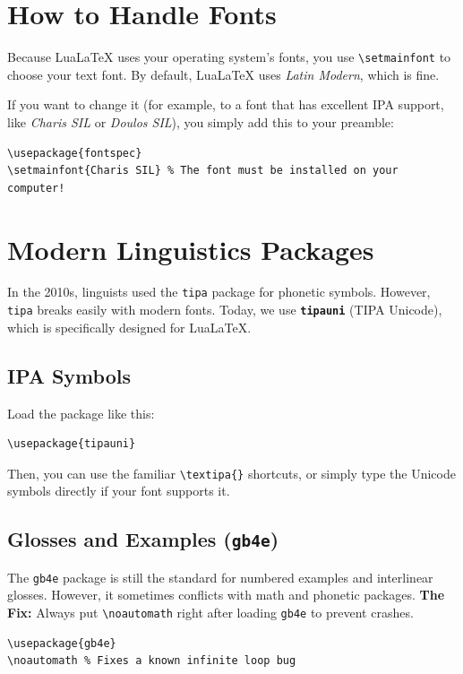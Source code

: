 \documentclass[11pt,a4paper]{article}
\begin{document}
\section{How to Handle Fonts}

Because LuaLaTeX uses your operating system's fonts, you use \texttt{\textbackslash setmainfont} to choose your text font. By default, LuaLaTeX uses \textit{Latin Modern}, which is fine.

If you want to change it (for example, to a font that has excellent IPA support, like \textit{Charis SIL} or \textit{Doulos SIL}), you simply add this to your preamble:
\begin{lstlisting}
\usepackage{fontspec}
\setmainfont{Charis SIL} % The font must be installed on your computer!
\end{lstlisting}

\section{Modern Linguistics Packages}

In the 2010s, linguists used the \texttt{tipa} package for phonetic symbols. However, \texttt{tipa} breaks easily with modern fonts. Today, we use \textbf{\texttt{tipauni}} (TIPA Unicode), which is specifically designed for LuaLaTeX.

\subsection{IPA Symbols}
Load the package like this:
\begin{lstlisting}
\usepackage{tipauni}
\end{lstlisting}
Then, you can use the familiar \texttt{\textbackslash textipa\{\}} shortcuts, or simply type the Unicode symbols directly if your font supports it.

\subsection{Glosses and Examples (\texttt{gb4e})}
The \texttt{gb4e} package is still the standard for numbered examples and interlinear glosses. However, it sometimes conflicts with math and phonetic packages.
\textbf{The Fix:} Always put \texttt{\textbackslash noautomath} right after loading \texttt{gb4e} to prevent crashes.

\begin{lstlisting}
\usepackage{gb4e}
\noautomath % Fixes a known infinite loop bug
\end{lstlisting}
\end{document}
